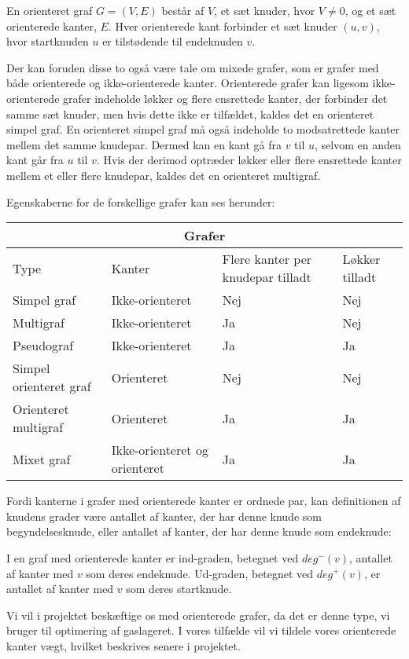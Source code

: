 \begin{defn}
En orienteret graf $G=(V,E)$ består af $V$, et sæt knuder, hvor $V\neq0$, og et sæt orienterede kanter, $E$. Hver orienterede kant forbinder et sæt knuder $(u,v)$, hvor startknuden $u$ er tilstødende til endeknuden $v$. 
\end{defn}





Der kan foruden disse to også være tale om mixede grafer, som er grafer med både orienterede og ikke-orienterede kanter. Orienterede grafer kan ligesom ikke-orienterede grafer indeholde løkker og flere ensrettede kanter, der forbinder det samme sæt knuder, men hvis dette ikke er tilfældet, kaldes det en orienteret simpel graf. En orienteret simpel graf må også indeholde to modsatrettede kanter mellem det samme knudepar. Dermed kan en kant gå fra $v$ til $u$, selvom en anden kant går fra $u$ til $v$. Hvis der derimod optræder løkker eller flere ensrettede kanter mellem et eller flere knudepar, kaldes det en orienteret multigraf.  

Egenskaberne for de forskellige grafer kan ses herunder:

\begin{center}
\begin{tabular}{ |p{4cm}|p{3cm}|p{3cm}|p{2cm}|  }
 \hline
 \multicolumn{4}{|c|}{Grafer} \\
 \hline
 Type & Kanter & Flere kanter per knudepar tilladt & Løkker tilladt\\
 \hline
 Simpel graf   & Ikke-orienteret    & Nej &   Nej\\
 Multigraf &   Ikke-orienteret & Ja   & Nej\\
 Pseudograf & Ikke-orienteret & Ja &  Ja\\
 Simpel orienteret graf    & Orienteret & Nej &  Nej\\
 Orienteret multigraf &  Orienteret  & Ja & Ja\\
 Mixet graf & Ikke-orienteret og orienteret  & Ja   & Ja\\
 \hline
\end{tabular}
\end{center}

Fordi kanterne i grafer med orienterede kanter er ordnede par, kan definitionen af knudens grader være antallet af kanter, der har denne knude som begyndelsesknude, eller antallet af kanter, der har denne knude som endeknude:
\begin{defn}
I en graf med orienterede kanter er ind-graden, betegnet ved $deg^{-}(v)$, antallet af kanter med $v$ som deres endeknude. Ud-graden, betegnet ved $deg^{+}(v)$, er antallet af kanter med $v$ som deres startknude.
\end{defn}
Vi vil i projektet beskæftige os med orienterede grafer, da det er denne type, vi bruger til optimering af gaslageret. I vores tilfælde vil vi tildele vores orienterede kanter vægt, hvilket beskrives senere i projektet.
